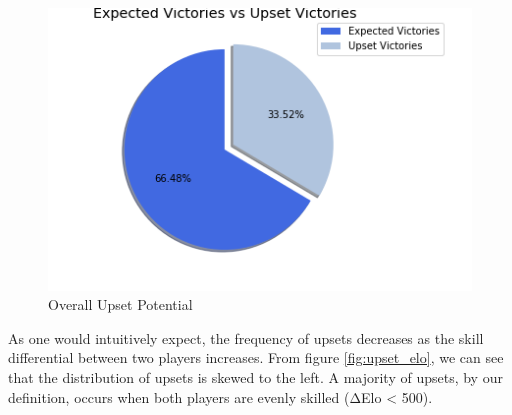 \documentclass[reprint,
 amsmath,amssymb,nobibnotes,
 aps, floatfix]{revtex4-1}
\begin{document}
\begin{figure}
    \centering
    \includegraphics[scale=.5]{davis_image5.png}
    \caption{Overall Upset Potential}
    \label{fig:Base_Upset}
\end{figure}

As one would intuitively expect, the frequency of upsets decreases as the skill differential between two players increases. From figure \ref{fig:upset_elo}, we can see that the distribution of upsets is skewed to the left. A majority of upsets, by our definition, occurs when both players are evenly skilled (ΔElo < 500).  
\end{document}
